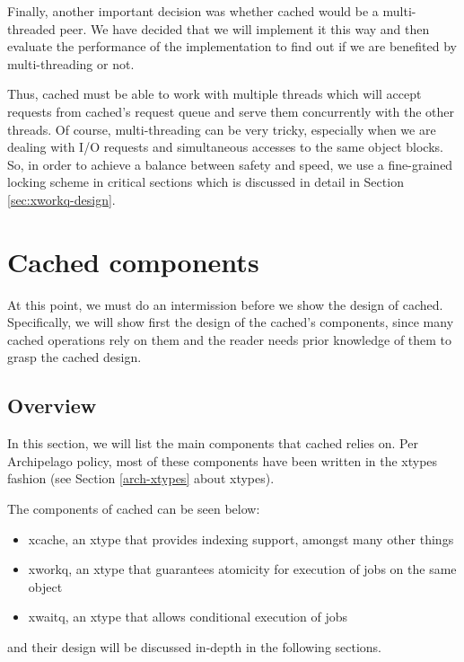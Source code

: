 Finally, another important decision was whether cached would be a 
multi-threaded peer. We have decided that we will implement it this way and 
then evaluate the performance of the implementation to find out if we are 
benefited by multi-threading or not.

Thus, cached must be able to work with multiple threads which will accept 
requests from cached's request queue and serve them concurrently with the other 
threads. Of course, multi-threading can be very tricky, especially when we are 
dealing with I/O requests and simultaneous accesses to the same object blocks.  
So, in order to achieve a balance between safety and speed, we use a
fine-grained locking scheme in critical sections which is discussed in detail 
in Section \ref{sec:xworkq-design}.

\section{Cached components}\label{sec:comp-design}

At this point, we must do an intermission before we show the design of cached.  
Specifically, we will show first the design of the cached's components, since 
many cached operations rely on them and the reader needs prior knowledge of 
them to grasp the cached design.

\subsection{Overview}

In this section, we will list the main components that cached relies on. Per 
Archipelago policy, most of these components have been written in the xtypes 
fashion (see Section \ref{arch-xtypes} about xtypes).  

The components of cached can be seen below:
 
\begin{itemize}
	\item xcache, an xtype that provides indexing support, amongst many 
		other things
	\item xworkq, an xtype that guarantees atomicity for execution of jobs 
		on the same object
	\item xwaitq, an xtype that allows conditional execution of jobs
\end{itemize}

and their design will be discussed in-depth in the following sections.

